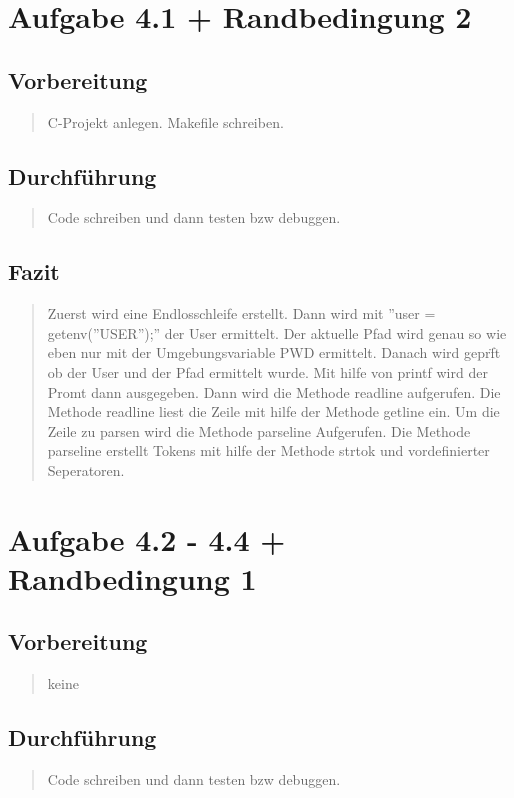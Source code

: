 \section{Aufgabe 4.1 + Randbedingung 2}
	\subsection{Vorbereitung}
		\begin{quote}
			C-Projekt anlegen.
			Makefile schreiben.
		\end{quote}
	\subsection{Durchführung}
		\begin{quote}
			Code schreiben und dann testen bzw debuggen.
		\end{quote}
	\subsection{Fazit}
		\begin{quote}
			Zuerst wird eine Endlosschleife erstellt. Dann wird mit ''user = getenv(''USER'');'' der User ermittelt. Der aktuelle Pfad wird genau so wie eben nur mit der Umgebungsvariable PWD ermittelt. Danach wird gepr\"ft ob der User und der Pfad ermittelt wurde. Mit hilfe von printf wird der Promt dann ausgegeben. Dann wird die Methode readline aufgerufen.  Die Methode readline liest die Zeile mit hilfe der Methode getline ein. Um die Zeile zu parsen wird die Methode parseline Aufgerufen. Die Methode parseline erstellt Tokens mit hilfe der Methode strtok und vordefinierter Seperatoren.
		\end{quote}

\section{Aufgabe 4.2 - 4.4 + Randbedingung 1}
	\subsection{Vorbereitung}
		\begin{quote}
			keine
		\end{quote}
	\subsection{Durchführung}
		\begin{quote}
			Code schreiben und dann testen bzw debuggen.
		\end{quote}
